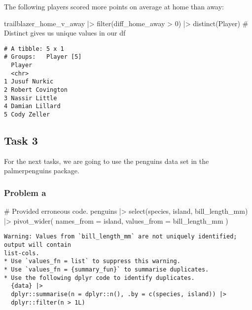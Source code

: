 \documentclass[
  letterpaper,
  DIV=11,
  numbers=noendperiod]{scrartcl}
\newenvironment{Shaded}{\begin{snugshade}}{\end{snugshade}}
\newcommand{\AttributeTok}[1]{\textcolor[rgb]{0.40,0.45,0.13}{#1}}
\newcommand{\CommentTok}[1]{\textcolor[rgb]{0.37,0.37,0.37}{#1}}
\newcommand{\DecValTok}[1]{\textcolor[rgb]{0.68,0.00,0.00}{#1}}
\newcommand{\FunctionTok}[1]{\textcolor[rgb]{0.28,0.35,0.67}{#1}}
\newcommand{\NormalTok}[1]{\textcolor[rgb]{0.00,0.23,0.31}{#1}}
\newcommand{\SpecialCharTok}[1]{\textcolor[rgb]{0.37,0.37,0.37}{#1}}
\begin{document}
The following players scored more points on average at home than away:

\begin{Shaded}
\begin{Highlighting}[]
\NormalTok{trailblazer\_home\_v\_away }\SpecialCharTok{|\textgreater{}}
  \FunctionTok{filter}\NormalTok{(diff\_home\_away }\SpecialCharTok{\textgreater{}} \DecValTok{0}\NormalTok{) }\SpecialCharTok{|\textgreater{}}
  \FunctionTok{distinct}\NormalTok{(Player) }\CommentTok{\# Distinct gives us unique values in our df}
\end{Highlighting}
\end{Shaded}

\begin{verbatim}
# A tibble: 5 x 1
# Groups:   Player [5]
  Player          
  <chr>           
1 Jusuf Nurkic    
2 Robert Covington
3 Nassir Little   
4 Damian Lillard  
5 Cody Zeller     
\end{verbatim}

\subsection{Task 3}\label{task-3}

For the next tasks, we are going to use the penguins data set in the
palmerpenguins package.

\subsubsection{Problem a}\label{problem-a}

\begin{Shaded}
\begin{Highlighting}[]
\CommentTok{\# Provided erroneous code.}
\NormalTok{penguins }\SpecialCharTok{|\textgreater{}}
  \FunctionTok{select}\NormalTok{(species, island, bill\_length\_mm) }\SpecialCharTok{|\textgreater{}}
  \FunctionTok{pivot\_wider}\NormalTok{(}
    \AttributeTok{names\_from =}\NormalTok{ island, }\AttributeTok{values\_from =}\NormalTok{ bill\_length\_mm}
\NormalTok{  )}
\end{Highlighting}
\end{Shaded}

\begin{verbatim}
Warning: Values from `bill_length_mm` are not uniquely identified; output will contain
list-cols.
* Use `values_fn = list` to suppress this warning.
* Use `values_fn = {summary_fun}` to summarise duplicates.
* Use the following dplyr code to identify duplicates.
  {data} |>
  dplyr::summarise(n = dplyr::n(), .by = c(species, island)) |>
  dplyr::filter(n > 1L)
\end{verbatim}
\end{document}
